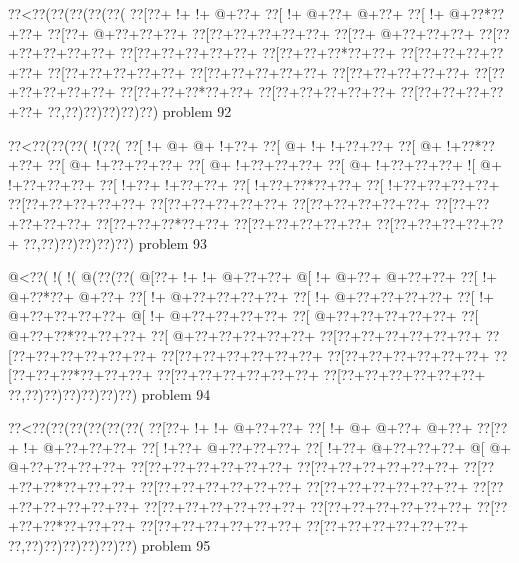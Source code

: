 \vbox{\vbox{\goo
\0??<\0??(\0??(\0??(\0??(\0??(
\0??[\0??+\- !+\- !+\- @+\0??+
\0??[\- !+\- @+\0??+\- @+\0??+
\0??[\- !+\- @+\0??*\0??+\0??+
\0??[\0??+\- @+\0??+\0??+\0??+
\0??[\0??+\0??+\0??+\0??+\0??+
\0??[\0??+\- @+\0??+\0??+\0??+
\0??[\0??+\0??+\0??+\0??+\0??+
\0??[\0??+\0??+\0??+\0??+\0??+
\0??[\0??+\0??+\0??*\0??+\0??+
\0??[\0??+\0??+\0??+\0??+\0??+
\0??[\0??+\0??+\0??+\0??+\0??+
\0??[\0??+\0??+\0??+\0??+\0??+
\0??[\0??+\0??+\0??+\0??+\0??+
\0??[\0??+\0??+\0??+\0??+\0??+
\0??[\0??+\0??+\0??*\0??+\0??+
\0??[\0??+\0??+\0??+\0??+\0??+
\0??[\0??+\0??+\0??+\0??+\0??+
\0??,\0??)\0??)\0??)\0??)\0??)
}
\hfil problem 92\hfil\break
}

\vbox{\vbox{\goo
\0??<\0??(\0??(\0??(\- !(\0??(
\0??[\- !+\- @+\- @+\- !+\0??+
\0??[\- @+\- !+\- !+\0??+\0??+
\0??[\- @+\- !+\0??*\0??+\0??+
\0??[\- @+\- !+\0??+\0??+\0??+
\0??[\- @+\- !+\0??+\0??+\0??+
\0??[\- @+\- !+\0??+\0??+\0??+
\- ![\- @+\- !+\0??+\0??+\0??+
\0??[\- !+\0??+\- !+\0??+\0??+
\0??[\- !+\0??+\0??*\0??+\0??+
\0??[\- !+\0??+\0??+\0??+\0??+
\0??[\0??+\0??+\0??+\0??+\0??+
\0??[\0??+\0??+\0??+\0??+\0??+
\0??[\0??+\0??+\0??+\0??+\0??+
\0??[\0??+\0??+\0??+\0??+\0??+
\0??[\0??+\0??+\0??*\0??+\0??+
\0??[\0??+\0??+\0??+\0??+\0??+
\0??[\0??+\0??+\0??+\0??+\0??+
\0??,\0??)\0??)\0??)\0??)\0??)
}
\hfil problem 93\hfil\break
}

\vbox{\vbox{\goo
\- @<\0??(\- !(\- !(\- @(\0??(\0??(
\- @[\0??+\- !+\- !+\- @+\0??+\0??+
\- @[\- !+\- @+\0??+\- @+\0??+\0??+
\0??[\- !+\- @+\0??*\0??+\- @+\0??+
\0??[\- !+\- @+\0??+\0??+\0??+\0??+
\0??[\- !+\- @+\0??+\0??+\0??+\0??+
\0??[\- !+\- @+\0??+\0??+\0??+\0??+
\- @[\- !+\- @+\0??+\0??+\0??+\0??+
\0??[\- @+\0??+\0??+\0??+\0??+\0??+
\0??[\- @+\0??+\0??*\0??+\0??+\0??+
\0??[\- @+\0??+\0??+\0??+\0??+\0??+
\0??[\0??+\0??+\0??+\0??+\0??+\0??+
\0??[\0??+\0??+\0??+\0??+\0??+\0??+
\0??[\0??+\0??+\0??+\0??+\0??+\0??+
\0??[\0??+\0??+\0??+\0??+\0??+\0??+
\0??[\0??+\0??+\0??*\0??+\0??+\0??+
\0??[\0??+\0??+\0??+\0??+\0??+\0??+
\0??[\0??+\0??+\0??+\0??+\0??+\0??+
\0??,\0??)\0??)\0??)\0??)\0??)\0??)
}
\hfil problem 94\hfil\break
}

\vbox{\vbox{\goo
\0??<\0??(\0??(\0??(\0??(\0??(\0??(
\0??[\0??+\- !+\- !+\- @+\0??+\0??+
\0??[\- !+\- @+\- @+\0??+\- @+\0??+
\0??[\0??+\- !+\- @+\0??+\0??+\0??+
\0??[\- !+\0??+\- @+\0??+\0??+\0??+
\0??[\- !+\0??+\- @+\0??+\0??+\0??+
\- @[\- @+\- @+\0??+\0??+\0??+\0??+
\0??[\0??+\0??+\0??+\0??+\0??+\0??+
\0??[\0??+\0??+\0??+\0??+\0??+\0??+
\0??[\0??+\0??+\0??*\0??+\0??+\0??+
\0??[\0??+\0??+\0??+\0??+\0??+\0??+
\0??[\0??+\0??+\0??+\0??+\0??+\0??+
\0??[\0??+\0??+\0??+\0??+\0??+\0??+
\0??[\0??+\0??+\0??+\0??+\0??+\0??+
\0??[\0??+\0??+\0??+\0??+\0??+\0??+
\0??[\0??+\0??+\0??*\0??+\0??+\0??+
\0??[\0??+\0??+\0??+\0??+\0??+\0??+
\0??[\0??+\0??+\0??+\0??+\0??+\0??+
\0??,\0??)\0??)\0??)\0??)\0??)\0??)
}
\hfil problem 95\hfil\break
}

